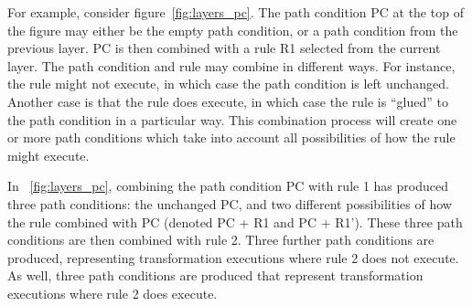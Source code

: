 For example, consider figure~\ref{fig:layers_pc}. The path condition PC at the top of the figure may either be the empty path condition, or a path condition from the previous layer. PC is then combined with a rule R1 
selected from the current layer. The path condition and rule may combine in different ways. For instance, the rule might not execute, in which case the path condition is left unchanged. Another case is that the rule does execute, in which case the rule is ``glued'' to the path condition in a particular way. This combination process will create one or more path conditions which take into account all possibilities of how the rule might execute.

In ~\ref{fig:layers_pc}, combining the path condition PC with rule 1 has produced three path conditions: the unchanged PC, and two different possibilities of how the rule combined with PC (denoted PC + R1 and PC + R1'). These three path conditions are then combined with rule 2. Three further path conditions are produced, representing transformation executions where rule 2 does not execute. As well, three path conditions are produced that represent transformation executions where rule 2 does execute.


